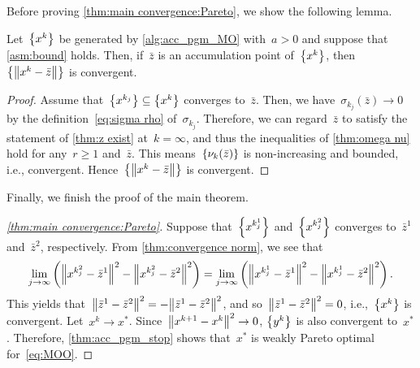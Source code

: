 \documentclass[../main]{subfiles}
\begin{document}
Before proving \cref{thm:main convergence:Pareto}, we show the following lemma.
\begin{lemma} \label{thm:convergence norm}
    Let~$\set*{x^k}$ be generated by \cref{alg:acc_pgm_MO} with~$a > 0$ and suppose that \cref{asm:bound} holds.
    Then, if~$\bar{z}$ is an accumulation point of~$\set*{x^k}$, then~$\set*{\norm*{x^k - \bar{z}}}$ is convergent.
\end{lemma}
\begin{proof}
    Assume that~$\set*{x^{k_j}} \subseteq \set*{x^k}$ converges to~$\bar{z}$.
    Then, we have~$\sigma_{k_j}(\bar{z}) \to 0$ by the definition~\cref{eq:sigma rho} of~$\sigma_{k_j}$.
    Therefore, we can regard~$\bar{z}$ to satisfy the statement of \cref{thm:z exist} at~$k = \infty$, and thus the inequalities of \cref{thm:omega nu} hold for any~$r \ge 1$ and~$\bar{z}$.
    This means~$\set*{\nu_k(\bar{z})}$ is non-increasing and bounded, i.e., convergent.
    Hence~$\set*{\norm*{x^k - \bar{z}}}$ is convergent.
\end{proof}

Finally, we finish the proof of the main theorem.
\begin{proof}[\cref{thm:main convergence:Pareto}]
    Suppose that~$\set*{x^{k^1_j}}$ and~$\set*{x^{k^2_j}}$ converges to~$\bar{z}^1$ and~$\bar{z}^2$, respectively.
    From \cref{thm:convergence norm}, we see that
    \[
        \lim_{j \to \infty} \left( \norm*{x^{k^2_j} - \bar{z}^1}^2 - \norm*{x^{k^2_j} - \bar{z}^2}^2 \right) = \lim_{j \to \infty} \left( \norm*{x^{k^1_j} - \bar{z}^1}^2 - \norm*{x^{k^1_j} - \bar{z}^2}^2 \right) 
    .\] 
    This yields that~$\norm*{\bar{z}^1 - \bar{z}^2}^2 = - \norm*{\bar{z}^1 - \bar{z}^2}^2$, and so~$\norm*{\bar{z}^1 - \bar{z}^2}^2 = 0$, i.e.,~$\set*{x^k}$ is convergent.
    Let~$x^k \to x^\ast$.
    Since~$\norm*{x^{k + 1} - x^k}^2 \to 0$, $\set*{y^k}$ is also convergent to~$x^\ast$.
    Therefore, \cref{thm:acc_pgm_stop} shows that~$x^\ast$ is weakly Pareto optimal for~\cref{eq:MOO}.
\end{proof}
\end{document}

